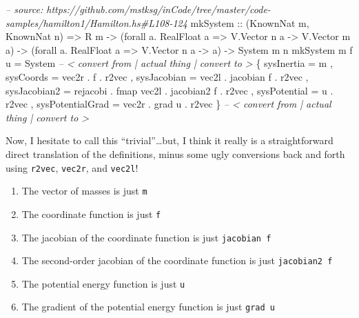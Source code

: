 \documentclass[]{article}
\newenvironment{Shaded}{}{}
\newcommand{\DataTypeTok}[1]{\textcolor[rgb]{0.56,0.13,0.00}{#1}}
\newcommand{\CommentTok}[1]{\textcolor[rgb]{0.38,0.63,0.69}{\textit{#1}}}
\newcommand{\OtherTok}[1]{\textcolor[rgb]{0.00,0.44,0.13}{#1}}
\newcommand{\FunctionTok}[1]{\textcolor[rgb]{0.02,0.16,0.49}{#1}}
\newcommand{\NormalTok}[1]{#1}
\begin{document}
\begin{Shaded}
\begin{Highlighting}[]
\CommentTok{-- source: https://github.com/mstksg/inCode/tree/master/code-samples/hamilton1/Hamilton.hs#L108-124}
\NormalTok{mkSystem}
\OtherTok{    ::}\NormalTok{ (}\DataTypeTok{KnownNat}\NormalTok{ m, }\DataTypeTok{KnownNat}\NormalTok{ n)}
    \OtherTok{=>} \DataTypeTok{R}\NormalTok{ m}
    \OtherTok{->}\NormalTok{ (forall a}\FunctionTok{.} \DataTypeTok{RealFloat}\NormalTok{ a }\OtherTok{=>} \DataTypeTok{V.Vector}\NormalTok{ n a }\OtherTok{->} \DataTypeTok{V.Vector}\NormalTok{ m a)}
    \OtherTok{->}\NormalTok{ (forall a}\FunctionTok{.} \DataTypeTok{RealFloat}\NormalTok{ a }\OtherTok{=>} \DataTypeTok{V.Vector}\NormalTok{ n a }\OtherTok{->}\NormalTok{ a)}
    \OtherTok{->} \DataTypeTok{System}\NormalTok{ m n}
\NormalTok{mkSystem m f u }\FunctionTok{=} \DataTypeTok{System}
                  \CommentTok{-- < convert from | actual thing | convert to >}
\NormalTok{    \{ sysInertia       }\FunctionTok{=}\NormalTok{                         m}
\NormalTok{    , sysCoords        }\FunctionTok{=}\NormalTok{      vec2r }\FunctionTok{.}\NormalTok{            f }\FunctionTok{.}\NormalTok{ r2vec}
\NormalTok{    , sysJacobian      }\FunctionTok{=}\NormalTok{      vec2l }\FunctionTok{.}\NormalTok{   jacobian f }\FunctionTok{.}\NormalTok{ r2vec}
\NormalTok{    , sysJacobian2     }\FunctionTok{=}\NormalTok{ rejacobi}
                       \FunctionTok{.}\NormalTok{ fmap vec2l }\FunctionTok{.}\NormalTok{  jacobian2 f }\FunctionTok{.}\NormalTok{ r2vec}
\NormalTok{    , sysPotential     }\FunctionTok{=}\NormalTok{                         u }\FunctionTok{.}\NormalTok{ r2vec}
\NormalTok{    , sysPotentialGrad }\FunctionTok{=}\NormalTok{      vec2r }\FunctionTok{.}\NormalTok{       grad u }\FunctionTok{.}\NormalTok{ r2vec}
\NormalTok{    \}}
                  \CommentTok{-- < convert from | actual thing | convert to >}
\end{Highlighting}
\end{Shaded}

Now, I hesitate to call this ``trivial''\ldots{}but, I think it really is a
straightforward direct translation of the definitions, minus some ugly
conversions back and forth using \texttt{r2vec}, \texttt{vec2r}, and
\texttt{vec2l}!

\begin{enumerate}
\def\labelenumi{\arabic{enumi}.}
\tightlist
\item
  The vector of masses is just \texttt{m}
\item
  The coordinate function is just \texttt{f}
\item
  The jacobian of the coordinate function is just \texttt{jacobian\ f}
\item
  The second-order jacobian of the coordinate function is just
  \texttt{jacobian2\ f}
\item
  The potential energy function is just \texttt{u}
\item
  The gradient of the potential energy function is just \texttt{grad\ u}
\end{enumerate}
\end{document}
